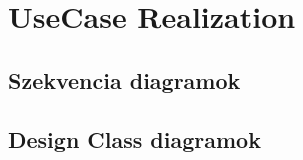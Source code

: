 \chapter{UseCase Realization}\label{sect:UseCaseRealization}

\section{Szekvencia diagramok}
\section{Design Class diagramok}
